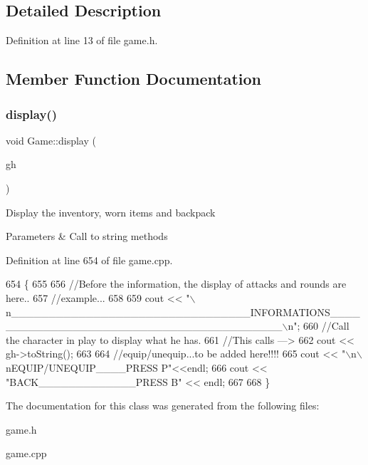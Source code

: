 \subsection{Detailed Description}


Definition at line 13 of file game.\+h.



\subsection{Member Function Documentation}
\hypertarget{class_game_ac8c66f86b907bc8afc33c8e31b800611}{}\label{class_game_ac8c66f86b907bc8afc33c8e31b800611} 
\subsubsection{\texorpdfstring{display()}{display()}}
{\footnotesize\ttfamily void Game\+::display (\begin{DoxyParamCaption}\item[{\hyperlink{class_game_character}{Game\+Character} $\ast$}]{gh }\end{DoxyParamCaption})}

Display the inventory, worn items and backpack 
\begin{DoxyParams}{Parameters}
{\em } & Call to string methods \\
\hline
\end{DoxyParams}


Definition at line 654 of file game.\+cpp.


\begin{DoxyCode}
654                                    \{
655 
656     \textcolor{comment}{//Before the information, the display of attacks and rounds are here..}
657     \textcolor{comment}{//example...}
658 
659     cout << \textcolor{stringliteral}{"\(\backslash\)n\_\_\_\_\_\_\_\_\_\_\_\_\_\_\_\_\_\_\_\_\_\_\_\_\_\_\_\_\_\_\_\_INFORMATIONS\_\_\_\_\_\_\_\_\_\_\_\_\_\_\_\_\_\_\_\_\_\_\_\_\_\_\_\_\_\_\_\_\_\_\_\_\_\_\_\_\_\(\backslash\)n"};
660     \textcolor{comment}{//Call the character in play to display what he has.}
661     \textcolor{comment}{//This calls ---> }
662     cout << gh->toString();
663 
664     \textcolor{comment}{//equip/unequip...to be added here!!!! }
665     cout << \textcolor{stringliteral}{"\(\backslash\)n\(\backslash\)nEQUIP/UNEQUIP\_\_\_\_PRESS P"}<<endl;
666     cout << \textcolor{stringliteral}{"BACK\_\_\_\_\_\_\_\_\_\_\_\_\_PRESS B"} << endl;
667     
668 \}
\end{DoxyCode}


The documentation for this class was generated from the following files\+:\begin{DoxyCompactItemize}
\item 
game.\+h\item 
game.\+cpp\end{DoxyCompactItemize}
